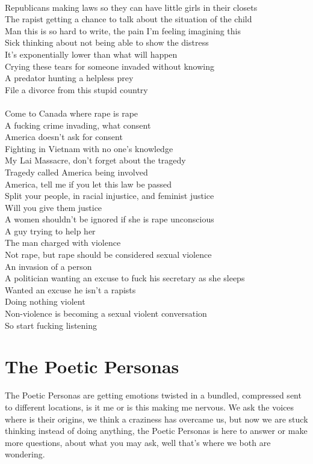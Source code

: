 \documentclass[12pt, b5paper, oneside]{book}
\begin{document}
\\Republicans making laws so they can have little girls in their closets 
\\The rapist getting a chance to talk about the situation of the child
\\Man this is so hard to write, the pain I'm feeling imagining this 
\\Sick thinking about not being able to show the distress
\\It's exponentially lower than what will happen 
\\Crying these tears for someone invaded without knowing 
\\A predator hunting a helpless prey
\\File a divorce from this stupid country
%
\\\\Come to Canada where rape is rape
\\A fucking crime invading, what consent 
\\America doesn't ask for consent 
\\Fighting in Vietnam with no one's knowledge 
\\My Lai Massacre, don't forget about the tragedy
\\Tragedy called America being involved 
\\America, tell me if you let this law be passed 
\\Split your people, in racial injustice, and feminist justice 
\\Will you give them justice 
\\A women shouldn't be ignored if she is rape unconscious
\\A guy trying to help her 
\\The man charged with violence 
\\Not rape, but rape should be considered sexual violence 
\\An invasion of a person 
\\A politician wanting an excuse to fuck his secretary as she sleeps
\\Wanted an excuse he isn't a rapists
\\Doing nothing violent 
\\Non-violence is becoming a sexual violent conversation
\\So start fucking listening 
\newpage
\chapter{The Poetic Personas}
The Poetic Personas are getting emotions twisted in a bundled, compressed sent to different locations, 
is it me or is this making me nervous. We ask the voices where is their origins, we think  a craziness 
has overcame us, but now we are stuck thinking instead of doing anything, the Poetic Personas is here to 
answer or make more questions, about what you may ask, well that's where we both are wondering. 
\newpage
\end{document}
